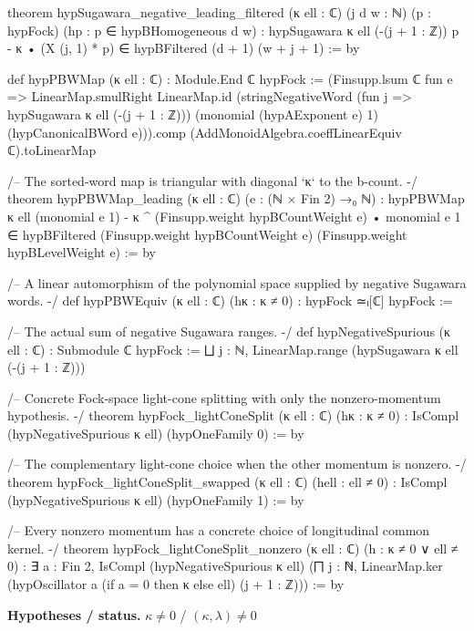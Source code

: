 \documentclass[11pt,openany]{book}
\theoremstyle{definition}
\theoremstyle{plain}
\begin{document}
\begin{leancode}
theorem hypSugawara_negative_leading_filtered (κ ell : ℂ) (j d w : ℕ)
    (p : hypFock) (hp : p ∈ hypBHomogeneous d w) :
    hypSugawara κ ell (-(j + 1 : ℤ)) p - κ • (X (j, 1) * p) ∈
      hypBFiltered (d + 1) (w + j + 1) := by

def hypPBWMap (κ ell : ℂ) : Module.End ℂ hypFock :=
  (Finsupp.lsum ℂ fun e => LinearMap.smulRight LinearMap.id
    (stringNegativeWord (fun j => hypSugawara κ ell (-(j + 1 : ℤ)))
      (monomial (hypAExponent e) 1) (hypCanonicalBWord e))).comp
    (AddMonoidAlgebra.coeffLinearEquiv ℂ).toLinearMap

/-- The sorted-word map is triangular with diagonal `κ` to the b-count. -/
theorem hypPBWMap_leading (κ ell : ℂ) (e : (ℕ × Fin 2) →₀ ℕ) :
    hypPBWMap κ ell (monomial e 1) -
      κ ^ (Finsupp.weight hypBCountWeight e) • monomial e 1 ∈
      hypBFiltered (Finsupp.weight hypBCountWeight e) (Finsupp.weight hypBLevelWeight e) := by

/-- A linear automorphism of the polynomial space supplied by negative Sugawara words. -/
def hypPBWEquiv (κ ell : ℂ) (hκ : κ ≠ 0) : hypFock ≃ₗ[ℂ] hypFock :=

/-- The actual sum of negative Sugawara ranges. -/
def hypNegativeSpurious (κ ell : ℂ) : Submodule ℂ hypFock :=
  ⨆ j : ℕ, LinearMap.range (hypSugawara κ ell (-(j + 1 : ℤ)))

/-- Concrete Fock-space light-cone splitting with only the nonzero-momentum hypothesis. -/
theorem hypFock_lightConeSplit (κ ell : ℂ) (hκ : κ ≠ 0) :
    IsCompl (hypNegativeSpurious κ ell) (hypOneFamily 0) := by

/-- The complementary light-cone choice when the other momentum is nonzero. -/
theorem hypFock_lightConeSplit_swapped (κ ell : ℂ) (hell : ell ≠ 0) :
    IsCompl (hypNegativeSpurious κ ell) (hypOneFamily 1) := by

/-- Every nonzero momentum has a concrete choice of longitudinal common kernel. -/
theorem hypFock_lightConeSplit_nonzero (κ ell : ℂ) (h : κ ≠ 0 ∨ ell ≠ 0) :
    ∃ a : Fin 2, IsCompl (hypNegativeSpurious κ ell)
      (⨅ j : ℕ, LinearMap.ker (hypOscillator a (if a = 0 then κ else ell) (j + 1 : ℤ))) := by
\end{leancode}
\noindent\textbf{Hypotheses / status.} $\kappa\ne0$ / $(\kappa,\lambda)\ne0$\par
\medskip
\end{document}
